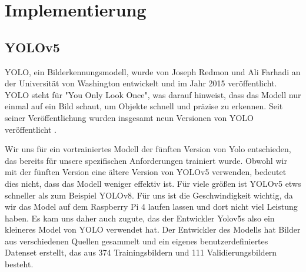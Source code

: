 \section{Implementierung}

\subsection{YOLOv5}
YOLO, ein Bilderkennungsmodell, wurde von Joseph Redmon und Ali Farhadi an der Universität von Washington entwickelt und im Jahr 2015 veröffentlicht. YOLO steht für "You Only Look Once", was darauf hinweist, dass das Modell nur einmal auf ein Bild schaut, um Objekte schnell und präzise zu erkennen. Seit seiner Veröffentlichung wurden insgesamt neun Versionen von YOLO veröffentlicht \cite{Yolo}.

Wir uns für ein vortrainiertes Modell der fünften Version von Yolo entschieden, das bereits für unsere spezifischen Anforderungen trainiert wurde. Obwohl wir mit der fünften Version eine ältere Version von YOLOv5 verwenden, bedeutet dies nicht, dass das Modell weniger effektiv ist. Für viele größen ist YOLOv5 etws schneller als zum Beispiel YOLOv8. Für uns ist die Geschwindigkeit wichtig, da wir das Model auf dem Raspberry Pi 4 laufen lassen und dort nicht viel Leistung haben.  Es kam uns daher auch zugute, das der Entwickler Yolov5s also ein kleineres Model von YOLO verwendet hat.   Der Entwickler des Modells hat Bilder aus verschiedenen Quellen gesammelt und ein eigenes benutzerdefiniertes Datenset erstellt, das aus 374 Trainingsbildern und 111 Validierungsbildern besteht.


